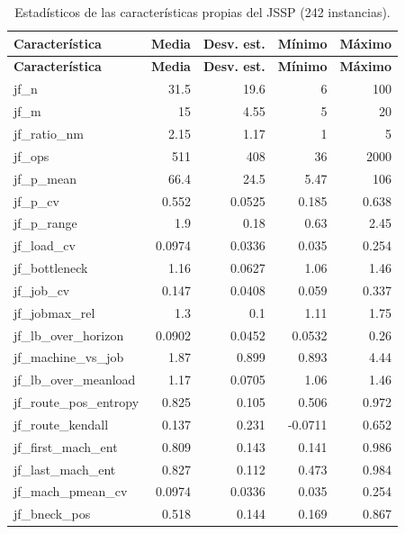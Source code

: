 {\small
\singlespacing
\begin{longtable}{>{\ttfamily}l r r r r}
\caption{Estadísticos de las características propias del JSSP (242 instancias).}\label{tab:anexo_propias}\\
\toprule
\normalfont\textbf{Característica} & \textbf{Media} & \textbf{Desv. est.} & \textbf{Mínimo} & \textbf{Máximo} \\
\midrule
\endfirsthead
\toprule
\normalfont\textbf{Característica} & \textbf{Media} & \textbf{Desv. est.} & \textbf{Mínimo} & \textbf{Máximo} \\
\midrule
\endhead
\bottomrule
\endfoot
jf\_n & 31.5 & 19.6 & 6 & 100 \\
jf\_m & 15 & 4.55 & 5 & 20 \\
jf\_ratio\_nm & 2.15 & 1.17 & 1 & 5 \\
jf\_ops & 511 & 408 & 36 & 2000 \\
jf\_p\_mean & 66.4 & 24.5 & 5.47 & 106 \\
jf\_p\_cv & 0.552 & 0.0525 & 0.185 & 0.638 \\
jf\_p\_range & 1.9 & 0.18 & 0.63 & 2.45 \\
jf\_load\_cv & 0.0974 & 0.0336 & 0.035 & 0.254 \\
jf\_bottleneck & 1.16 & 0.0627 & 1.06 & 1.46 \\
jf\_job\_cv & 0.147 & 0.0408 & 0.059 & 0.337 \\
jf\_jobmax\_rel & 1.3 & 0.1 & 1.11 & 1.75 \\
jf\_lb\_over\_horizon & 0.0902 & 0.0452 & 0.0532 & 0.26 \\
jf\_machine\_vs\_job & 1.87 & 0.899 & 0.893 & 4.44 \\
jf\_lb\_over\_meanload & 1.17 & 0.0705 & 1.06 & 1.46 \\
jf\_route\_pos\_entropy & 0.825 & 0.105 & 0.506 & 0.972 \\
jf\_route\_kendall & 0.137 & 0.231 & -0.0711 & 0.652 \\
jf\_first\_mach\_ent & 0.809 & 0.143 & 0.141 & 0.986 \\
jf\_last\_mach\_ent & 0.827 & 0.112 & 0.473 & 0.984 \\
jf\_mach\_pmean\_cv & 0.0974 & 0.0336 & 0.035 & 0.254 \\
jf\_bneck\_pos & 0.518 & 0.144 & 0.169 & 0.867 \\
\end{longtable}
}
